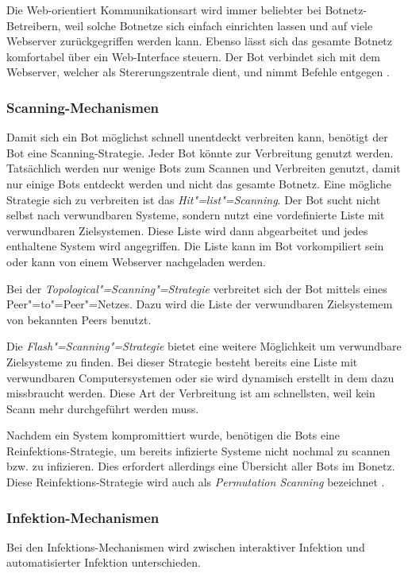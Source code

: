 Die Web-orientiert Kommunikationsart wird immer beliebter bei Botnetz-Betreibern,
weil solche Botnetze sich einfach einrichten lassen und auf viele Webserver
zurückgegriffen werden kann. Ebenso lässt sich das gesamte Botnetz komfortabel über
ein Web-Interface steuern. Der Bot verbindet sich mit dem Webserver, welcher
als Stererungszentrale dient, und nimmt Befehle entgegen \cite{kamluk}. 

\subsubsection{Scanning-Mechanismen}
Damit sich ein Bot möglichst schnell unentdeckt verbreiten kann, benötigt der
Bot eine Scanning-Strategie. Jeder Bot könnte zur Verbreitung genutzt werden.
Tatsächlich werden nur wenige Bots zum Scannen und Verbreiten genutzt, damit nur
einige Bots entdeckt werden und nicht das gesamte Botnetz. Eine mögliche
Strategie sich zu verbreiten ist das \emph{Hit"=list"=Scanning}. Der Bot 
sucht nicht selbst nach verwundbaren Systeme, sondern nutzt eine vordefinierte
Liste mit verwundbaren Zielsystemen. Diese Liste wird dann abgearbeitet und 
jedes enthaltene System wird angegriffen. Die Liste kann im Bot vorkompiliert
sein oder kann von einem Webserver nachgeladen werden.

Bei der \emph{Topological"=Scanning"=Strategie} verbreitet sich der Bot mittels
eines Peer"=to"=Peer"=Netzes. Dazu wird die Liste der verwundbaren Zielsystemem
von bekannten Peers benutzt.

Die \emph{Flash"=Scanning"=Strategie} bietet eine weitere Möglichkeit um
verwundbare Zielsysteme zu finden. Bei dieser Strategie besteht bereits
eine Liste mit verwundbaren Computersystemen oder sie wird dynamisch
erstellt in dem  dazu missbraucht werden. Diese Art der Verbreitung
ist am schnellsten, weil kein Scann mehr durchgeführt werden muss.

Nachdem ein System kompromittiert wurde, benötigen die Bots eine Reinfektions-Strategie, 
um bereits infizierte Systeme nicht nochmal zu scannen bzw. zu infizieren. Dies
erfordert allerdings eine Übersicht aller Bots im Bonetz. Diese 
Reinfektions-Strategie wird auch als \emph{Permutation Scanning} bezeichnet
\cite{baier}.

\subsubsection{Infektion-Mechanismen}
Bei den Infektions-Mechanismen wird zwischen interaktiver Infektion und
automatisierter Infektion unterschieden.


